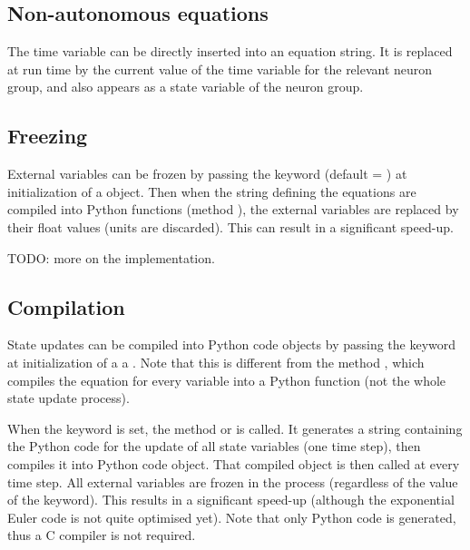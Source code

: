 \documentclass[letterpaper,10pt]{manual}
\begin{document}
\subsection{Non-autonomous equations}

The time variable  can be directly inserted into an equation string.
It is replaced at run time by the current value of the time variable for the relevant
neuron group, and also appears as a state variable of the neuron group.

\subsection{Freezing}

External variables can be frozen by passing the keyword 
(default = ) at initialization of a \hyperlink{brian.NeuronGroup}{} object.
Then when the string defining the equations are compiled into Python functions
(method ),
the external variables are replaced by their float values (units are discarded).
This can result in a significant speed-up.

TODO: more on the implementation.

\subsection{Compilation}

State updates can be compiled into Python code objects by passing the keyword
 at initialization of a a \hyperlink{brian.NeuronGroup}{}.
Note that this is different from the method ,
which compiles the equation for every variable into a Python function
(not the whole state update process).

When the  keyword is set, the method 
or  is called. It generates
a string containing the Python code for the update of all state variables (one time step),
then compiles it into Python code object. That compiled object is then called at every time step.
All external variables are frozen in the process (regardless of the value of the  keyword).
This results in a significant speed-up (although the exponential Euler code is not
quite optimised yet). Note that only Python code is generated, thus a
C compiler is not required.
\end{document}
